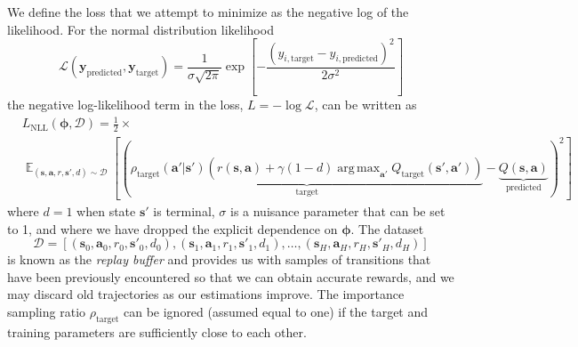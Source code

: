 \documentclass{article}
\DeclareMathOperator*{\argmax}{arg\,max}
\begin{document}
We define the loss that we attempt to minimize as the negative log of the likelihood. For the normal distribution likelihood
\begin{equation}
\mathcal{L}(\mathbf{y}_\text{predicted},\mathbf{y}_\text{target})=\frac{1}{\sigma\sqrt{2\pi}}\exp[-\frac{(y_{i,\text{target}}-y_{i,\text{predicted}})^2}{2\sigma^2}]
\end{equation}
the negative log-likelihood term in the loss, $L=-\log\mathcal{L}$, can be written as \begin{equation}\begin{split}\label{eq:likelihood_trajectory}&L_\text{NLL}(\boldsymbol{\phi},\mathcal{D})=\frac{1}{2}\times\\&\mathop{\mathbb{E}}_{(\mathbf{s},\mathbf{a},r,\mathbf{s}',d)\sim\mathcal{D}}\left[\left(\underbrace{\rho_\text{target}(\mathbf{a}'|\mathbf{s}')\left(r(\mathbf{s},\mathbf{a})+\gamma(1-d)\argmax_{\mathbf{a}'}Q_{\text{target}}(\mathbf{s}',\mathbf{a}')\right)}_\text{target}-\underbrace{Q(\mathbf{s},\mathbf{a})}_\text{predicted}\right)^2\right]\end{split}\end{equation}where $d=1$ when state $\mathbf{s}'$ is terminal,  $\sigma$ is a nuisance parameter that can be set to 1, and where we have dropped the explicit dependence on $\boldsymbol{\phi}$.  The dataset \begin{equation}\mathcal{D}=[(\mathbf{s}_0,\mathbf{a}_0,r_0,\mathbf{s}'_0,d_0),(\mathbf{s}_1,\mathbf{a}_1,r_1,\mathbf{s}'_1,d_1),\dots,(\mathbf{s}_H,\mathbf{a}_H,r_H,\mathbf{s}'_H,d_H)]\end{equation}is known as the \textit{replay buffer} and provides us with samples of transitions that have been previously encountered so that we can obtain accurate rewards, and we may discard old trajectories as our estimations improve. The importance sampling ratio $\rho_\text{target}$ can be ignored (assumed equal to one) if the target and training parameters are sufficiently close to each other.
\end{document}
